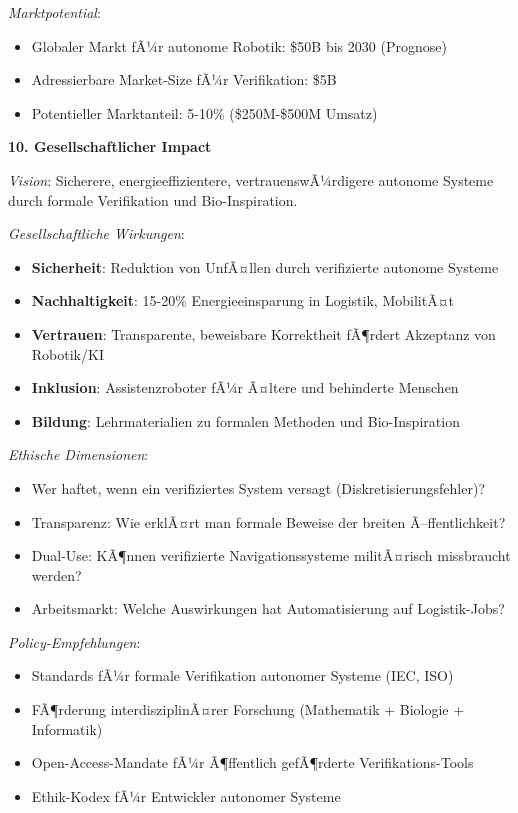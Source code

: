 ﻿\documentclass[a4paper,12pt]{article}
\theoremstyle{definition}
\begin{document}
\textit{Marktpotential}:
\begin{itemize}
	\item Globaler Markt fÃ¼r autonome Robotik: \$50B bis 2030 (Prognose)
	\item Adressierbare Market-Size fÃ¼r Verifikation: \$5B
	\item Potentieller Marktanteil: 5-10\% (\$250M-\$500M Umsatz)
\end{itemize}

\textbf{10. Gesellschaftlicher Impact}

\textit{Vision}: Sicherere, energieeffizientere, vertrauenswÃ¼rdigere autonome Systeme durch formale Verifikation und Bio-Inspiration.

\textit{Gesellschaftliche Wirkungen}:
\begin{itemize}
	\item \textbf{Sicherheit}: Reduktion von UnfÃ¤llen durch verifizierte autonome Systeme
	\item \textbf{Nachhaltigkeit}: 15-20\% Energieeinsparung in Logistik, MobilitÃ¤t
	\item \textbf{Vertrauen}: Transparente, beweisbare Korrektheit fÃ¶rdert Akzeptanz von Robotik/KI
	\item \textbf{Inklusion}: Assistenzroboter fÃ¼r Ã¤ltere und behinderte Menschen
	\item \textbf{Bildung}: Lehrmaterialien zu formalen Methoden und Bio-Inspiration
\end{itemize}

\textit{Ethische Dimensionen}:
\begin{itemize}
	\item Wer haftet, wenn ein verifiziertes System versagt (Diskretisierungsfehler)?
	\item Transparenz: Wie erklÃ¤rt man formale Beweise der breiten Ã–ffentlichkeit?
	\item Dual-Use: KÃ¶nnen verifizierte Navigationssysteme militÃ¤risch missbraucht werden?
	\item Arbeitsmarkt: Welche Auswirkungen hat Automatisierung auf Logistik-Jobs?
\end{itemize}

\textit{Policy-Empfehlungen}:
\begin{itemize}
	\item Standards fÃ¼r formale Verifikation autonomer Systeme (IEC, ISO)
	\item FÃ¶rderung interdisziplinÃ¤rer Forschung (Mathematik + Biologie + Informatik)
	\item Open-Access-Mandate fÃ¼r Ã¶ffentlich gefÃ¶rderte Verifikations-Tools
	\item Ethik-Kodex fÃ¼r Entwickler autonomer Systeme
\end{itemize}
\end{document}

